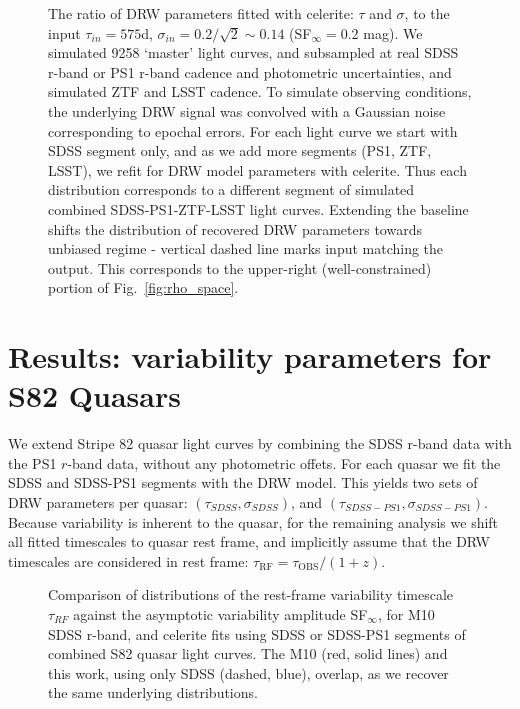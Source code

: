 \documentclass[twocolumn]{aastex62}
\newcommand{\project}[1]{\textsf{#1}}
\begin{document}
\begin{figure*}  %
\caption{The ratio of DRW parameters fitted with \project{celerite}: $\tau$ and $\sigma$, to the input $\tau_{in} = 575 $d, $\sigma_{in} = 0.2 / \sqrt{2} {\sim} 0.14$  (SF$_{\infty}=0.2$ mag). We simulated 9258 `master' light curves, and  subsampled at real SDSS r-band or PS1 r-band cadence and photometric uncertainties, and simulated ZTF and LSST cadence. To simulate observing conditions, the underlying DRW signal was convolved with a Gaussian noise corresponding to epochal errors. 
For each light curve we start with SDSS segment only, and as we add more segments (PS1, ZTF, LSST), we refit for DRW model parameters with \project{celerite}. Thus
each distribution corresponds to a different segment of simulated  combined SDSS-PS1-ZTF-LSST light curves. Extending the baseline shifts the distribution of recovered DRW parameters towards unbiased regime - vertical dashed line marks input matching the output. This corresponds to the upper-right (well-constrained) portion of Fig.~\ref{fig:rho_space}.}
\label{fig:lc_simulated_results}
\end{figure*} 


%
%
%
%
%
%

\section{Results: variability parameters for S82 Quasars}\label{sec:results}

We extend Stripe 82 quasar light curves by combining the SDSS r-band data with  the PS1 $r$-band data, without any photometric offets. For each quasar we fit the SDSS and SDSS-PS1 segments  with the DRW model. This yields two sets of DRW parameters per quasar: $(\tau_{SDSS}, \sigma_{SDSS})$, and $(\tau_{SDSS-PS1},\sigma_{SDSS-PS1})$. Because variability is inherent to the quasar, for the remaining analysis we shift all fitted timescales to quasar rest frame, and implicitly assume that the DRW timescales are considered in rest frame: $\tau_{\mathrm{RF}} = \tau_{\mathrm{OBS}} / (1+z)$.


\begin{figure} %
\caption{Comparison of distributions of the rest-frame variability timescale $\tau_{RF}$ against the  asymptotic variability amplitude SF$_{\infty}$, for M10 SDSS r-band,  and \project{celerite} fits using  SDSS or SDSS-PS1 segments of combined S82 quasar light curves. The M10 (red, solid lines) and this work, using only SDSS (dashed, blue), overlap, as we recover the same underlying distributions. }
\label{fig:tau_sf_dist}
\end{figure} 
\end{document}
